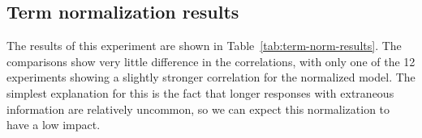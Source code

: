 %

\subsection{Term normalization results}
\label{sec:term-norm-results}

The results of this experiment are shown in Table~\ref{tab:term-norm-results}. The comparisons show very little difference in the correlations, with only one of the 12 experiments showing a slightly stronger correlation for the normalized model. The simplest explanation for this is the fact that longer responses with extraneous information are relatively uncommon, so we can expect this normalization to have a low impact.

